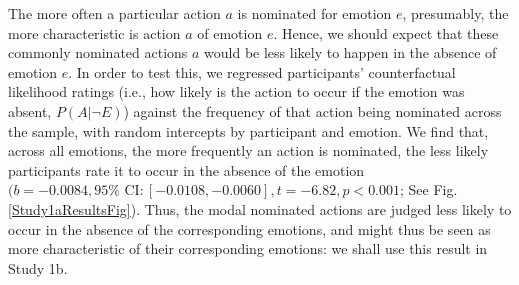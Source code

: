 \documentclass[10pt,letterpaper]{article}
\begin{document}
\begin{table}
\caption{ Action nominations from emotions (Study 1a). Top 5 responses for each emotion, with nomination counts. The most common responses for anger were variants of ``hit X", where X is an object or person (of these, the modal response was: ``punched the wall"). }
\label{Study1aResultsTable}
\end{table}



The more often a particular action $a$ is nominated for emotion $e$, presumably, the more characteristic is action $a$ of emotion $e$. Hence, we should expect that these commonly nominated actions $a$ would be less likely to happen in the absence of emotion $e$. In order to test this, we regressed participants' counterfactual likelihood ratings (i.e., how likely is the action to occur if the emotion was absent, $P(A | \neg E)$) against the frequency of that action being nominated across the sample, with random intercepts by participant and emotion. We find that, across all emotions, the more frequently an action is nominated, the less likely participants rate it to occur in the absence of the emotion $(b = -0.0084, 95\% \text{ CI}: [-0.0108, -0.0060], t=-6.82, p<0.001$; See Fig. \ref{Study1aResultsFig}). Thus, the modal nominated actions are judged less likely to occur in the absence of the corresponding emotions, and might thus be seen as more characteristic of their corresponding emotions: we shall use this result in Study 1b.
\end{document}
